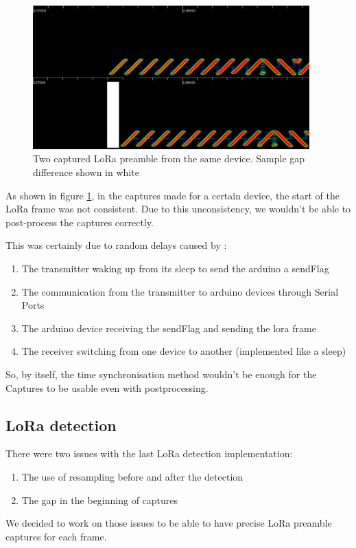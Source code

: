\documentclass[a4paper, 12pt]{article}
\begin{document}
\begin{figure}[H]
  \begin{center}
    \includegraphics[width=0.95\textwidth]{images/gapDif.png}
  \end{center}
  \caption{Two captured LoRa preamble from the same device. Sample gap difference shown in white }\label{fig:GapDif}
\end{figure}

As shown in figure \ref{fig:GapDif}, in the captures made for a certain device, the start of the LoRa frame was not consistent. Due to this unconsistency, we wouldn't be able to post-process the captures correctly.

\newpage

\noindent
This was certainly due to random delays caused by :
\begin{enumerate}
  \item The transmitter waking up from its sleep to send the arduino a sendFlag
  \item The communication from the transmitter to arduino devices through Serial Ports
  \item The arduino device receiving the sendFlag and sending the lora frame
  \item The receiver switching from one device to another (implemented like a sleep)
\end{enumerate}

So, by itself, the time synchronisation method wouldn't be enough for the Captures to be usable even with postprocessing.

\subsection{LoRa detection}
There were two issues with the last LoRa detection implementation:
\begin{enumerate}
  \item The use of resampling before and after the detection 
  \item The gap in the beginning of captures 
\end{enumerate}
We decided to work on those issues to be able to have precise LoRa preamble captures for each frame.  
\end{document}
